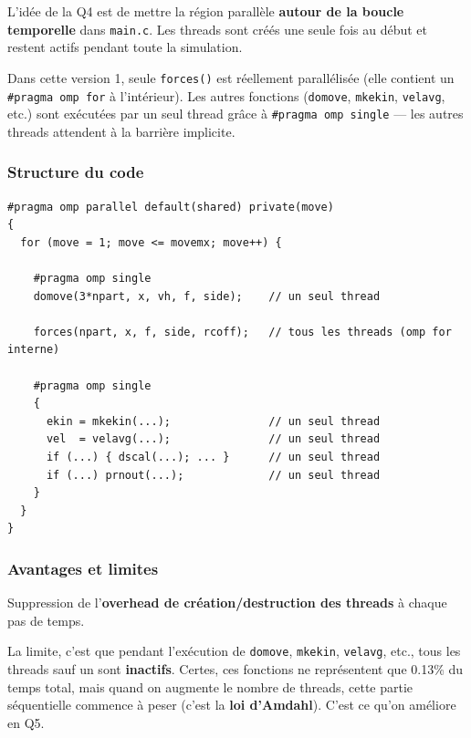 \documentclass[12pt,a4paper]{article}
\begin{document}
L'idée de la Q4 est de mettre la région parallèle \textbf{autour de la boucle temporelle} dans \texttt{main.c}. Les threads sont créés une seule fois au début et restent actifs pendant toute la simulation.

Dans cette version 1, seule \texttt{forces()} est réellement parallélisée (elle contient un \texttt{\#pragma omp for} à l'intérieur). Les autres fonctions (\texttt{domove}, \texttt{mkekin}, \texttt{velavg}, etc.) sont exécutées par un seul thread grâce à \texttt{\#pragma omp single} — les autres threads attendent à la barrière implicite.

\subsubsection{Structure du code}

\begin{lstlisting}[title={\color{mainblue} Version Q4 : \texttt{single} autour des fonctions non parallelisees}]
#pragma omp parallel default(shared) private(move)
{
  for (move = 1; move <= movemx; move++) {

    #pragma omp single
    domove(3*npart, x, vh, f, side);    // un seul thread

    forces(npart, x, f, side, rcoff);   // tous les threads (omp for interne)

    #pragma omp single
    {
      ekin = mkekin(...);               // un seul thread
      vel  = velavg(...);               // un seul thread
      if (...) { dscal(...); ... }      // un seul thread
      if (...) prnout(...);             // un seul thread
    }
  }
}
\end{lstlisting}

\subsubsection{Avantages et limites}

\begin{infobox}[Avantage]
Suppression de l'\textbf{overhead de création/destruction des threads} à chaque pas de temps.
\end{infobox}

La limite, c'est que pendant l'exécution de \texttt{domove}, \texttt{mkekin}, \texttt{velavg}, etc., tous les threads sauf un sont \textbf{inactifs}. Certes, ces fonctions ne représentent que 0.13\% du temps total, mais quand on augmente le nombre de threads, cette partie séquentielle commence à peser (c'est la \textbf{loi d'Amdahl}). C'est ce qu'on améliore en Q5.
\end{document}
